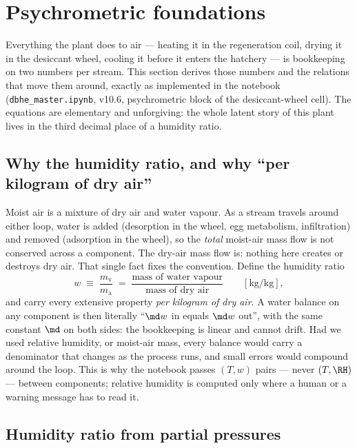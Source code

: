 \section{Psychrometric foundations}\label{sec:psy:top}
\label{sec:psy:foundations}

Everything the plant does to air --- heating it in the regeneration coil, drying it in the desiccant
wheel, cooling it before it enters the hatchery --- is bookkeeping on two numbers per stream. This
section derives those numbers and the relations that move them around, exactly as implemented in the
notebook (\texttt{dbhe\_master.ipynb}, v10.6, psychrometric block of the desiccant-wheel cell). The
equations are elementary and unforgiving: the whole latent story of this plant lives in the third
decimal place of a humidity ratio.

\subsection{Why the humidity ratio, and why ``per kilogram of dry air''}
\label{sec:psy:why-w}

Moist air is a mixture of dry air and water vapour. As a stream travels around either loop, water is
added (desorption in the wheel, egg metabolism, infiltration) and removed (adsorption in the wheel),
so the \emph{total} moist-air mass flow is not conserved across a component. The dry-air mass flow
is: nothing here creates or destroys dry air. That single fact fixes the convention. Define the
humidity ratio
\begin{equation}
w \;\equiv\; \frac{m_{\mathrm{v}}}{m_{\mathrm{a}}}
\;=\; \frac{\text{mass of water vapour}}{\text{mass of dry air}}
\qquad [\si{\kilogram\per\kilogram}] , \label{eq:psy:wdef}
\end{equation}
and carry every extensive property \emph{per kilogram of dry air}. A water balance on any component
is then literally ``$\md w$ in equals $\md w$ out'', with the same constant $\md$ on both sides: the
bookkeeping is linear and cannot drift. Had we used relative humidity, or moist-air mass, every
balance would carry a denominator that changes as the process runs, and small errors would compound
around the loop. This is why the notebook passes $(T,w)$ pairs --- never $(T,\RH)$ --- between
components; relative humidity is computed only where a human or a warning message has to read it.

\subsection{Humidity ratio from partial pressures}
\label{sec:psy:partial}

